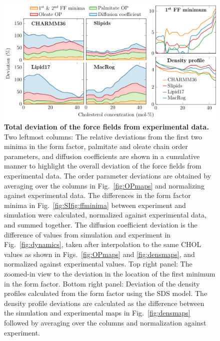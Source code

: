 \documentclass[journal=jctcce]{achemso}
\begin{document}
\begin{figure}[htb!]
  \centering
  \includegraphics[width=\linewidth]{../FIGS/deviation.pdf}
  \caption{\label{fig:deviation}%
  \textbf{Total deviation of the force fields from experimental data.} 
%
  Two leftmost columns:
  The relative deviations from the first two minima in the form factor, palmitate and oleate chain order parameters, and diffusion coefficients are shown in a cumulative manner to highlight the overall deviation of the force fields from experimental data.
  The order parameter deviations are obtained by averaging over the columns in Fig.~\ref{fig:OPmaps} and normalizing against experimental data. The differences in the form factor minima in Fig.~\ref{fig:SIfig:ffminima} between experiment and simulation were calculated, normalized against experimental data, and summed together. The diffusion coefficient deviation is the difference of values from simulation and experiment in Fig.~\ref{fig:dynamics}, taken after interpolation to the same CHOL values as shown in Figs.~\ref{fig:OPmaps} and \ref{fig:densmaps}, and normalized against experimental values.
%
  Top right panel: 
  The zoomed-in view to the deviation in the location of the first minimum in the form factor.
%
  Bottom right panel:
  Deviation of the density profiles calculated from the form factor using the SDS model. The density profile deviations are calculated as the difference between the simulation and experimental maps in Fig.~\ref{fig:densmaps} followed by averaging over the columns and normalization against experiment.
  }
\end{figure}
\end{document}
